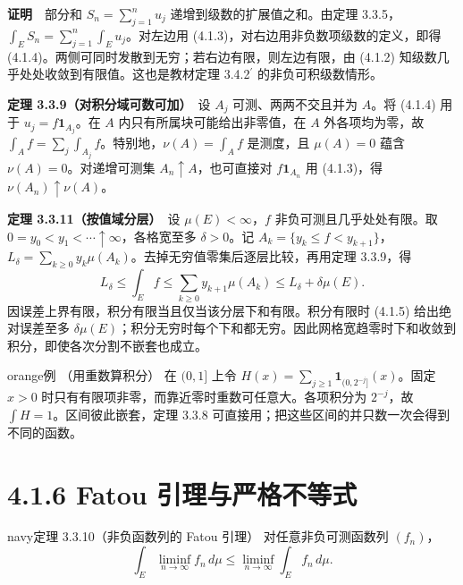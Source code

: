 \documentclass[11pt,a4paper]{article}
\begin{document}
\textbf{证明}　部分和 \(S_n=\sum_{j=1}^n u_j\)
递增到级数的扩展值之和。由定理
3.3.5，\(\int_E S_n=\sum_{j=1}^n\int_Eu_j\)。对左边用
(4.1.3)，对右边用非负数项级数的定义，即得
(4.1.4)。两侧可同时发散到无穷；若右边有限，则左边有限，由 (4.1.2)
知级数几乎处处收敛到有限值。这也是教材定理 3.4.2\ensuremath{{}^{\prime}} 的非负可积级数情形。

\textbf{定理 3.3.9（对积分域可数可加）}　设 \(A_j\) 可测、两两不交且并为
\(A\)。将 (4.1.4) 用于 \(u_j=f\mathbf1_{A_j}\)。在 \(A\)
内只有所属块可能给出非零值，在 \(A\) 外各项均为零，故
\(\int_A f=\sum_j\int_{A_j}f\)。特别地，\(\nu(A)=\int_A f\) 是测度，且
\(\mu(A)=0\) 蕴含 \(\nu(A)=0\)。对递增可测集
\(A_n\uparrow A\)，也可直接对 \(f\mathbf1_{A_n}\) 用 (4.1.3)，得
\(\nu(A_n)\uparrow\nu(A)\)。

\textbf{定理 3.3.11（按值域分层）}　设 \(\mu(E)<\infty\)，\(f\)
非负可测且几乎处处有限。取
\(0=y_0<y_1<\cdots\uparrow\infty\)，各格宽至多 \(\delta>0\)。记
\(A_k=\{y_k\le f<y_{k+1}\}\)，\(L_\delta=\sum_{k\ge0}y_k\mu(A_k)\)。去掉无穷值零集后逐层比较，再用定理
3.3.9，得 \begin{equation*}
L_\delta\le\int_E f\le\sum_{k\ge0}y_{k+1}\mu(A_k)
\le L_\delta+\delta\mu(E).\tag{4.1.5}
\end{equation*} 因误差上界有限，积分有限当且仅当该分层下和有限。积分有限时 (4.1.5)
给出绝对误差至多
\(\delta\mu(E)\)；积分无穷时每个下和都无穷。因此网格宽趋零时下和收敛到积分，即使各次分割不嵌套也成立。

\begin{sboxenv}{orange}{例 （用重数算积分）}
在 \((0,1]\) 上令 \(H(x)=\sum_{j\ge1}\mathbf1_{(0,2^{-j}]}(x)\)。固定
\(x>0\) 时只有有限项非零，而靠近零时重数可任意大。各项积分为
\(2^{-j}\)，故 \(\int H=1\)。区间彼此嵌套，定理 3.3.8
可直接用；把这些区间的并只数一次会得到不同的函数。

\end{sboxenv}

\clearpage\section[\S{}4.1.6 Fatou
引理与严格不等式]{4.1.6 Fatou
引理与严格不等式}\label{fatou-ux5f15ux7406ux4e0eux4e25ux683cux4e0dux7b49ux5f0f}

\begin{sboxenv}{navy}{定理 3.3.10（非负函数列的 Fatou 引理）}
对任意非负可测函数列 \((f_n)\)， \begin{equation*}
\int_E\liminf_{n\to\infty} f_n\,d\mu
\le\liminf_{n\to\infty}\int_E f_n\,d\mu .\tag{4.1.6}
\end{equation*}

\end{sboxenv}
\end{document}
